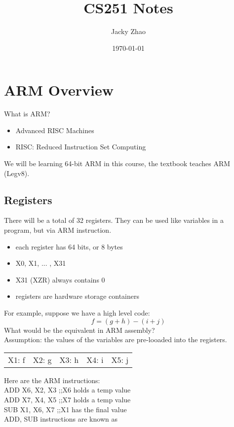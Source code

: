 \documentclass[letterpaper, 12pt]{article}
\newcommand{\red}[1]{{\color{red}{#1}}}
\begin{document}
    
    \clearpage
    \vspace*{\fill}
    \begin{center}
        \begin{minipage}{\textwidth} 
            \title{CS251 Notes}
            \author{Jacky Zhao}
            \date{\today}
            \maketitle
        \end{minipage} 
    \end{center}
    \vfill
    \thispagestyle{empty}
    \newpage
    \setcounter{page}{1}

    \section{ARM Overview}
    What is ARM?\\
    \begin{itemize}
        \item Advanced RISC Machines
        \item RISC: Reduced Instruction Set Computing
    \end{itemize}
    We will be learning 64-bit ARM in this course, the textbook teaches ARM (Legv8).\\
    \bigskip
    \subsection{Registers}
    There will be a total of 32 registers. They can be used like variables in a program, but via ARM instruction.\\
    \begin{itemize}
        \item each register has 64 bits, or 8 bytes
        \item X0, X1, ... , X31
        \item X31 (XZR) always contains 0
        \item registers are hardware storage containers
    \end{itemize}
    \bigskip
    For example, suppose we have a high level code:\\
    $$f = (g+h)-(i+j)$$
    What would be the equivalent in ARM assembly?\\
    Assumption: the values of the variables are pre-looaded into the registers.\\
    \bigskip
    \begin{tabular}{ccccc}
        X1: f & X2: g & X3: h & X4: i & X5: j\\
    \end{tabular}
    \bigskip
    Here are the ARM instructions:\\
    ADD X6, X2, X3 ;;X6 holds a temp value\\
    ADD X7, X4, X5 ;;X7 holds a temp value\\
    SUB X1, X6, X7 ;;X1 has the final value\\
    \bigskip
    ADD, SUB instructions are known as \red{R-format instructions}\\
\end{document}
